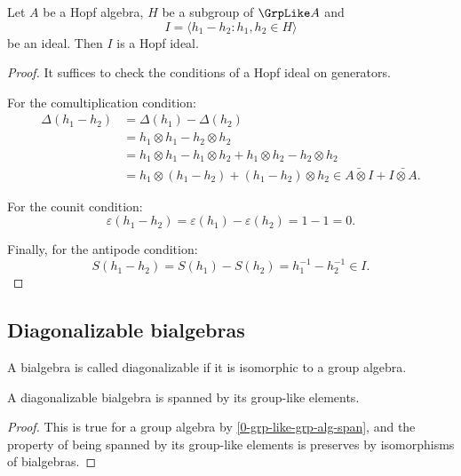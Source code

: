 \begin{proposition}
  \label{0-grp-like-quot-hopf}

  Let $A$ be a Hopf algebra, $H$ be a subgroup of $\GrpLike A$ and
  \[
    I = \langle h_1 - h_2 : h_1,h_2 \in H \rangle
  \]
  be an ideal. Then $I$ is a Hopf ideal.
\end{proposition}
\begin{proof}

  It suffices to check the conditions of a Hopf ideal on generators.

  For the comultiplication condition:
  \begin{align*}
    \Delta(h_1-h_2) &= \Delta(h_1) - \Delta(h_2) \\
    &= h_1 \otimes h_1 - h_2 \otimes h_2 \\
    &= h_1 \otimes h_1 - h_1 \otimes h_2 + h_1 \otimes h_2 - h_2 \otimes h_2 \\
    &= h_1 \otimes (h_1 - h_2) + (h_1 - h_2) \otimes h_2 \in \bar{A \otimes I} + \bar{I \otimes A}.
  \end{align*}

  For the counit condition:
  \[
    \varepsilon(h_1 - h_2) = \varepsilon(h_1) - \varepsilon(h_2) = 1 - 1 = 0.
  \]

  Finally, for the antipode condition:
  \[
    S(h_1 - h_2) = S(h_1) - S(h_2) = h_1^{-1} - h_2^{-1} \in I.
  \]
\end{proof}


\subsection{Diagonalizable bialgebras}


\begin{definition}
  \label{0-is-diag-bialg}
  \leanok

  A bialgebra is called diagonalizable if it is isomorphic to a group algebra.
\end{definition}


\begin{lemma}
  \label{0-is-diag-bialg-group-like-span}
  \leanok

  A diagonalizable bialgebra is spanned by its group-like elements.
\end{lemma}
\begin{proof}
  \leanok

  This is true for a group algebra by \ref{0-grp-like-grp-alg-span}, and the
  property of being spanned by its group-like elements is preserves by
  isomorphisms of bialgebras.
\end{proof}



